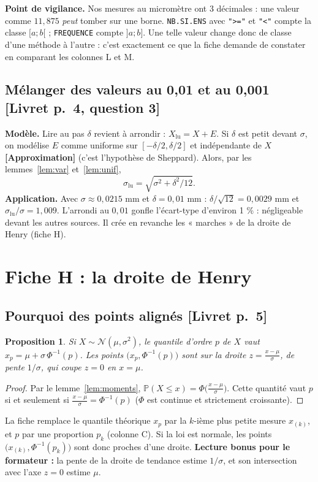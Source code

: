 \documentclass[11pt,a4paper]{article}
\theoremstyle{tq}
\newtheorem{prop}{Proposition}
\theoremstyle{remark}
\newcommand{\appr}{\textcolor{uimmred}{\textbf{[Approximation]}}}
\newcommand{\liv}[1]{\textcolor{uimmblue}{\small[Livret p.~#1]}}
\renewcommand{\P}{\mathbb{P}}
\newcommand{\N}{\mathcal{N}}
\begin{document}
\textbf{Point de vigilance.} Nos mesures au micromètre ont 3 décimales : une valeur comme $11{,}875$ \emph{peut} tomber sur une borne. \texttt{NB.SI.ENS} avec \texttt{">="} et \texttt{"<"} compte la classe $[a;b[$ ; \texttt{FREQUENCE} compte $]a;b]$. Une telle valeur change donc de classe d'une méthode à l'autre : c'est exactement ce que la fiche demande de constater en comparant les colonnes L et M.

\subsection{Mélanger des valeurs au 0,01 et au 0,001 \liv{4, question 3}}
\textbf{Modèle.} Lire au pas $\delta$ revient à arrondir : $X_{\text{lu}}=X+E$. Si $\delta$ est petit devant $\sigma$, on modélise $E$ comme uniforme sur $[-\delta/2,\delta/2]$ et indépendante de $X$ \appr{} (c'est l'hypothèse de Sheppard). Alors, par les lemmes~\ref{lem:var} et~\ref{lem:unif},
\[
\sigma_{\text{lu}}=\sqrt{\sigma^2+\delta^2/12}.
\]
\textbf{Application.} Avec $\sigma\approx0{,}0215$ mm et $\delta=0{,}01$ mm : $\delta/\sqrt{12}=0{,}0029$ mm et $\sigma_{\text{lu}}/\sigma=1{,}009$. L'arrondi au $0{,}01$ gonfle l'écart-type d'environ 1 \% : négligeable devant les autres sources. Il crée en revanche les « marches » de la droite de Henry (fiche H).

\section{Fiche H : la droite de Henry}\label{sec:H}

\subsection{Pourquoi des points alignés \liv{5}}
\begin{prop}
Si $X\sim\N(\mu,\sigma^2)$, le quantile d'ordre $p$ de $X$ vaut $x_p=\mu+\sigma\,\Phi^{-1}(p)$. Les points $\big(x_p,\Phi^{-1}(p)\big)$ sont sur la droite $z=\frac{x-\mu}{\sigma}$, de pente $1/\sigma$, qui coupe $z=0$ en $x=\mu$.
\end{prop}
\begin{proof}
Par le lemme~\ref{lem:moments}, $\P(X\le x)=\Phi\big(\frac{x-\mu}\sigma\big)$. Cette quantité vaut $p$ si et seulement si $\frac{x-\mu}{\sigma}=\Phi^{-1}(p)$ ($\Phi$ est continue et strictement croissante).
\end{proof}
La fiche remplace le quantile théorique $x_p$ par la $k$-ième plus petite mesure $x_{(k)}$, et $p$ par une proportion $p_k$ (colonne C). Si la loi est normale, les points $\big(x_{(k)},\Phi^{-1}(p_k)\big)$ sont donc proches d'une droite. \textbf{Lecture bonus pour le formateur :} la pente de la droite de tendance estime $1/\sigma$, et son intersection avec l'axe $z=0$ estime $\mu$.
\end{document}
